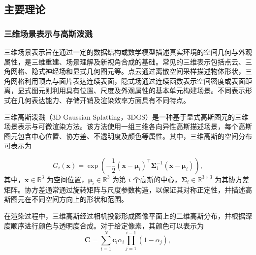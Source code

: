 
\subsection{主要理论}

\subsubsection{三维场景表示与高斯泼溅}

三维场景表示旨在通过一定的数据结构或数学模型描述真实环境的空间几何与外观属性，是三维重建、场景理解及新视角合成的基础。常见的三维表示包括点云、三角网格、隐式神经场和显式几何图元等。点云通过离散空间采样描述物体形状，三角网格利用顶点与面片表达连续表面，隐式场通过连续函数表示空间密度或表面距离，显式图元则利用具有位置、尺度及外观属性的基本单元构建场景。不同表示形式在几何表达能力、存储开销及渲染效率方面具有不同特点。

三维高斯泼溅（3D Gaussian Splatting，3DGS）是一种基于显式高斯图元的三维场景表示与可微渲染方法\cite{gs2023}。该方法使用一组三维各向异性高斯描述场景，每个高斯图元包含中心位置、协方差、不透明度及颜色等属性。其中，三维高斯的空间分布可表示为

\begin{equation}
  G_i(\mathbf{x})=\exp\left(
-\frac{1}{2}(\mathbf{x}-\boldsymbol{\mu}_i)^\top
\boldsymbol{\Sigma}_i^{-1}
(\mathbf{x}-\boldsymbol{\mu}_i)
\right),
  \label{eq:route-gaussian-distribution}
\end{equation}
其中，$\mathbf{x}\in\mathbb{R}^3$ 为空间位置，$\boldsymbol{\mu}_i\in\mathbb{R}^3$ 为第 $i$ 个高斯的中心，$\boldsymbol{\Sigma}_i\in\mathbb{R}^{3\times3}$ 为其协方差矩阵。协方差通常通过旋转矩阵与尺度参数构造，以保证其对称正定性，并描述高斯图元在不同空间方向上的形状和范围。

在渲染过程中，三维高斯经过相机投影形成图像平面上的二维高斯分布，并根据深度顺序进行颜色与透明度合成。对于给定像素，其颜色可以表示为
\begin{equation}
  \mathbf{C}=\sum_{i=1}^{N}
  \mathbf{c}_i\alpha_i
  \prod_{j=1}^{i-1}(1-\alpha_j),
  \label{eq:route-gaussian-color}
\end{equation}

